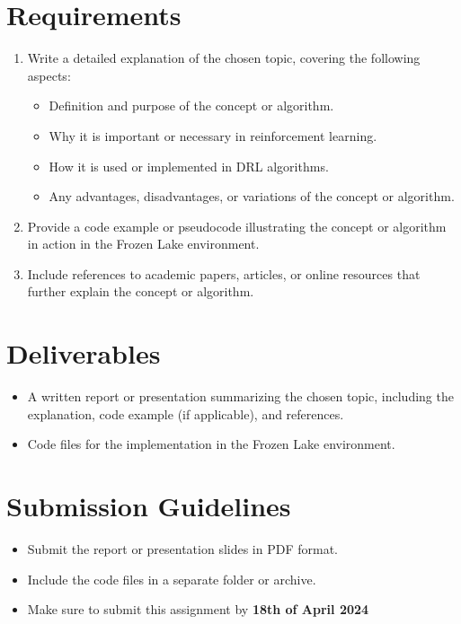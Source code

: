 \documentclass{article}
\begin{document}
\section*{Requirements}
\begin{enumerate}[label=\arabic*.]
    \item Write a detailed explanation of the chosen topic, covering the following aspects:
    \begin{itemize}
        \item Definition and purpose of the concept or algorithm.
        \item Why it is important or necessary in reinforcement learning.
        \item How it is used or implemented in DRL algorithms.
        \item Any advantages, disadvantages, or variations of the concept or algorithm.
    \end{itemize}
    \item Provide a code example or pseudocode illustrating the concept or algorithm in action in the Frozen Lake environment.
    \item Include references to academic papers, articles, or online resources that further explain the concept or algorithm.
\end{enumerate}

\section*{Deliverables}
\begin{itemize}
    \item A written report or presentation summarizing the chosen topic, including the explanation, code example (if applicable), and references.
    \item Code files for the implementation in the Frozen Lake environment.
\end{itemize}

\section*{Submission Guidelines}
\begin{itemize}
    \item Submit the report or presentation slides in PDF format.
    \item Include the code files in a separate folder or archive.
    \item Make sure to submit this assignment by \textbf{18th of April 2024}
\end{itemize}
\end{document}
